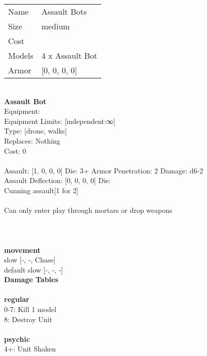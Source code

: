 \begin{tabular}{ll}
  Name & Assault Bots \\
  Size & medium\\
  Cost & \\
  Models & 4 x Assault Bot\\
  Armor & [0, 0, 0, 0]\\
\end{tabular}

\noindent \\ 


{\bf Assault Bot } \\
Equipment:  \\
Equipment Limits: [independent:∞] \\
Type: [drone, walks] \\
Replaces: Nothing \\
Cost: 0\\
\ \\
Assault: [1, 0, 0, 0] Die: 3+ Armor Penetration: 2 Damage: d6-2 \\
Assault Deflection: [0, 0, 0, 0] Die: \\
\indent Cunning assault[1 for 2]\\ 
 
\ \\
Can only enter play through mortars or drop weapons\\ 

\ \\
 
\ \\



\ \\ {\bf movement } \\
slow [-, -, Chase] \\
default slow [-, -, -] \\


{\bf Damage Tables} \\
\ \\ {\bf regular } \\
0-7: Kill 1 model \\
8: Destroy Unit \\
\ \\ {\bf psychic } \\
4+: Unit Shaken \\










